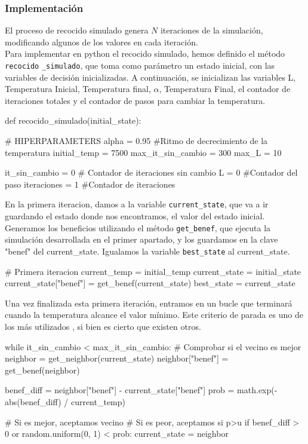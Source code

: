 \documentclass[a4paper,12pt]{article}
\begin{document}
	
	
	\subsubsection{Implementación}
	El proceso de recocido simulado genera $N$ iteraciones de la simulación, modificando algunos de los valores en cada iteración.\\
	
	Para implementar en python el recocido simulado, hemos definido el método \texttt{recocido} \texttt{\_simulado}, que toma como parámetro un estado inicial, con las variables de  	decisión inicializadas. A continuación, se inicializan las variables L, Temperatura Inicial, Temperatura final, $\alpha$, Temperatura Final, el contador de iteraciones totales y el contador de pasos para cambiar la temperatura. \\

	\begin{python}
def recocido_simulado(initial_state):
	
	# HIPERPARAMETERS
	alpha = 0.95 #Ritmo de decrecimiento de la temperatura
	initial_temp = 7500
	max_it_sin_cambio = 300
	max_L = 10
	
	it_sin_cambio = 0 # Contador de iteraciones sin cambio
	L = 0 #Contador del paso
	iteraciones = 1 #Contador de iteraciones
	\end{python}

	En la primera iteracion, damos a la variable \texttt{current\_state}, que va a ir guardando el estado donde nos encontramos, el valor del estado inicial.
	Generamos los beneficios utilizando el método \texttt{get\_benef}, que ejecuta la simulación desarrollada en el primer apartado, y los guardamos en la clave
	"benef" del current\_state. Igualamos la variable \texttt{best\_state} al current\_state.\\

	\begin{python}
	# Primera iteracion
	current_temp = initial_temp
	current_state = initial_state
	current_state["benef"] = get_benef(current_state)
	best_state = current_state
	\end{python}			

	Una vez finalizada esta primera iteración, entramos en un bucle que terminará cuando la temperatura alcance el valor mínimo. Este criterio de parada es uno de los más utilizados \cite{tfm}, si bien es cierto que existen otros.\\

	\begin{python}	
while it_sin_cambio < max_it_sin_cambio:
	# Comprobar si el vecino es mejor
	neighbor = get_neighbor(current_state)
	neighbor["benef"] = get_benef(neighbor)

	benef_diff = neighbor["benef"] - current_state["benef"]
	prob = math.exp(-abs(benef_diff) / current_temp)

	# Si es mejor, aceptamos vecino
	# Si es peor, aceptamos si p>u
	if benef_diff > 0 or random.uniform(0, 1) < prob:
		current_state = neighbor
	\end{python}	
\end{document}
